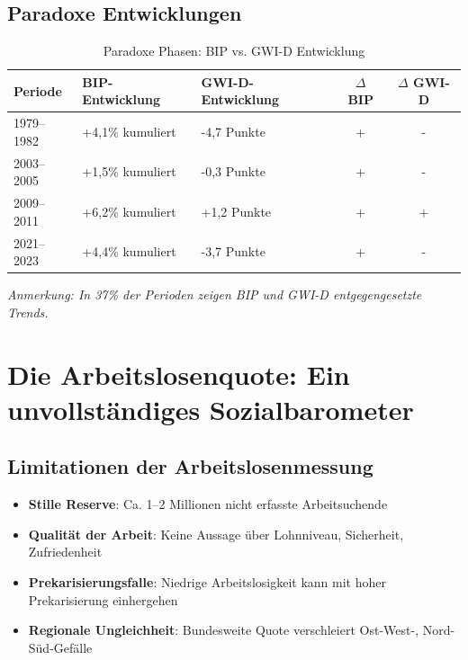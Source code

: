 \subsection{Paradoxe Entwicklungen}

\begin{table}[ht]
    \centering
    \caption{Paradoxe Phasen: BIP vs. GWI-D Entwicklung}
    \label{tab:paradoxe_phasen}
    \begin{tabular}{llp{6cm}cc}
        \toprule
        \textbf{Periode} & \textbf{BIP-Entwicklung} & \textbf{GWI-D-Entwicklung} & \textbf{$\Delta$ BIP} & \textbf{$\Delta$ GWI-D} \\
        \midrule
        1979–1982 & +4,1\% kumuliert & -4,7 Punkte & + & - \\
        2003–2005 & +1,5\% kumuliert & -0,3 Punkte & + & - \\
        2009–2011 & +6,2\% kumuliert & +1,2 Punkte & + & + \\
        2021–2023 & +4,4\% kumuliert & -3,7 Punkte & + & - \\
        \bottomrule
    \end{tabular}
\end{table}

\begin{flushleft}
\footnotesize{\textit{Anmerkung: In 37\% der Perioden zeigen BIP und GWI-D entgegengesetzte Trends.}}
\end{flushleft}

\section{Die Arbeitslosenquote: Ein unvollständiges Sozialbarometer}

\subsection{Limitationen der Arbeitslosenmessung}

\begin{itemize}
    \item \textbf{Stille Reserve}: Ca. 1–2 Millionen nicht erfasste Arbeitsuchende
    \item \textbf{Qualität der Arbeit}: Keine Aussage über Lohnniveau, Sicherheit, Zufriedenheit
    \item \textbf{Prekarisierungsfalle}: Niedrige Arbeitslosigkeit kann mit hoher Prekarisierung einhergehen
    \item \textbf{Regionale Ungleichheit}: Bundesweite Quote verschleiert Ost-West-, Nord-Süd-Gefälle
\end{itemize}

